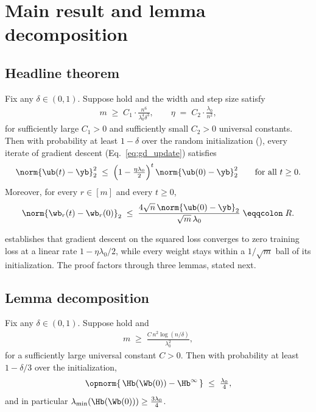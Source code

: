 \section{Main result and lemma decomposition}\label{sec:main_result}

\subsection{Headline theorem}\label{subsec:headline}

\begin{theorem}\label{thm:main}
Fix any $\delta \in (0, 1)$. Suppose  hold and the width and step size satisfy
\begin{align}\label{eq:thm_params}
m \;\ge\; C_1 \cdot \frac{n^6}{\lambda_0^4 \delta^3},
\qquad
\eta \;=\; C_2 \cdot \frac{\lambda_0}{n^2},
\end{align}
for sufficiently large $C_1 > 0$ and sufficiently small $C_2 > 0$ universal constants. Then with probability at least $1 - \delta$ over the random initialization (), every iterate of gradient descent (Eq.~\eqref{eq:gd_update}) satisfies
\begin{align}\label{eq:thm_linconv}
\norm{\ub(t) - \yb}_2^2 \;\le\; \Big( 1 - \tfrac{\eta \lambda_0}{2} \Big)^t \, \norm{\ub(0) - \yb}_2^2
\qquad \text{for all } t \ge 0.
\end{align}
Moreover, for every $r \in [m]$ and every $t \ge 0$,
\begin{align}\label{eq:thm_stayinit}
\norm{\wb_r(t) - \wb_r(0)}_2
\;\le\;
\frac{4 \sqrt n \, \norm{\ub(0) - \yb}_2}{\sqrt m \, \lambda_0}
\;\eqqcolon\; R.
\end{align}
\end{theorem}

 establishes that gradient descent on the squared loss converges to zero training loss at a linear rate $1 - \eta \lambda_0/2$, while every weight stays within a $1/\sqrt m$ ball of its initialization. The proof factors through three lemmas, stated next.

\subsection{Lemma decomposition}\label{subsec:decomp}

\begin{lemma}\label{lem:init_gram}
Fix any $\delta \in (0, 1)$. Suppose  hold and
\begin{align*}
m \;\ge\; \frac{C \, n^2 \log(n / \delta)}{\lambda_0^2},
\end{align*}
for a sufficiently large universal constant $C > 0$. Then with probability at least $1 - \delta/3$ over the initialization,
\begin{align*}
\opnorm{\, \Hb(\Wb(0)) - \Hb^\infty \,} \;\le\; \tfrac{\lambda_0}{4},
\end{align*}
and in particular $\lambda_{\min}(\Hb(\Wb(0))) \ge \tfrac{3 \lambda_0}{4}$.
\end{lemma}

